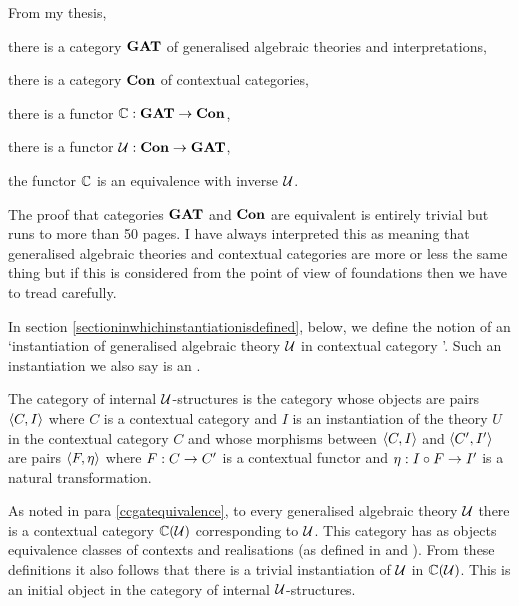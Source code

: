 
\note \label{ccgatequivalence}From my thesis, 
\begin{point}
there is a category $\catGAT$ of generalised algebraic theories and interpretations,
\end{point}
\begin{point}
there is a category $\catCon$ of contextual categories,
\end{point}
\begin{point}
there is a functor $\ccat[C]: \catGAT \morph \catCon$,
\end{point}
\begin{point}
there is a functor $\gat[U]:\catCon \morph \catGAT$,
\end{point}
\begin{point}
the functor $\ccat[C]$ is an equivalence with inverse $\gat[U]$.
\end{point}

\note
The proof that categories $\catGAT$ and $\catCon$ are equivalent  is entirely trivial but runs to more than 50 pages. I have always interpreted this as meaning that generalised algebraic theories and contextual categories are more or less the same thing but if this is considered from the point of view of foundations then we have to tread carefully.

\note 
In section \ref{sectioninwhichinstantiationisdefined}, below, we define the notion of 
an `instantiation of  generalised algebraic theory $\gat[U]$ in  contextual category \catc'. Such an instantiation we also say is an . 

\note
The category of internal $\gat[U]$-structures is the category whose objects
are pairs $\tuple{C,I}$ where $C$ is a contextual category and $I$ is an instantiation of the theory $U$ in the contextual category $C$ and whose morphisms between
 $\tuple{C,I}$ and $\tuple{C',I'}$ are pairs $\tuple{F, \eta}$ where
$F: C \morph C'$ is a contextual functor and $\eta: I \circ F \morph  I'$ is a natural transformation. 

\note 
As  noted in para \ref{ccgatequivalence}, to every generalised algebraic theory $\gat[U]$ there  is a contextual category $\CofU$ corresponding to $\gat[U]$. This category has as objects equivalence classes of contexts and realisations (as defined 
in \cite{Cartmell78} and  \cite{Cartmell86}). 
From these definitions it also follows that there is a trivial instantiation
of $\gat[U]$ in  $\CofU$. This is an initial object in
the category of internal $\gat[U]$-structures.

